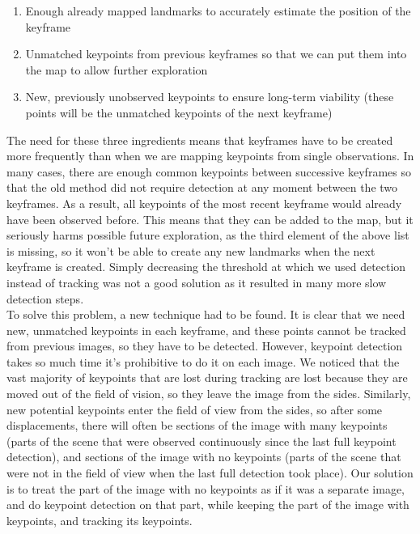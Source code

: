 \begin{enumerate}
\item Enough already mapped landmarks to accurately estimate the position of the keyframe
\item Unmatched keypoints from previous keyframes so that we can put them into the map to allow further exploration
\item New, previously unobserved keypoints to ensure long-term viability (these points will be the unmatched keypoints of the next keyframe)
\end{enumerate}

The need for these three ingredients means that keyframes have to be created more frequently than when we are mapping keypoints from single observations. In many cases, there are enough common keypoints between successive keyframes so that the old method did not require detection at any moment between the two keyframes. As a result, all keypoints of the most recent keyframe would already have been observed before. This means that they can be added to the map, but it seriously harms possible future exploration, as the third element of the above list is missing, so it won't be able to create any new landmarks when the next keyframe is created. Simply decreasing the threshold at which we used detection instead of tracking was not a good solution as it resulted in many more slow detection steps.\\

To solve this problem, a new technique had to be found. It is clear that we need new, unmatched keypoints in each keyframe, and these points cannot be tracked from previous images, so they have to be detected. However, keypoint detection takes so much time it's prohibitive to do it on each image. We noticed that the vast majority of keypoints that are lost during tracking are lost because they are moved out of the field of vision, so they leave the image from the sides. Similarly, new potential keypoints enter the field of view from the sides, so after some displacements, there will often be sections of the image with many keypoints (parts of the scene that were observed continuously since the last full keypoint detection), and sections of the image with no keypoints (parts of the scene that were not in the field of view when the last full detection took place). Our solution is to treat the part of the image with no keypoints as if it was a separate image, and do keypoint detection on that part, while keeping the part of the image with keypoints, and tracking its keypoints.

